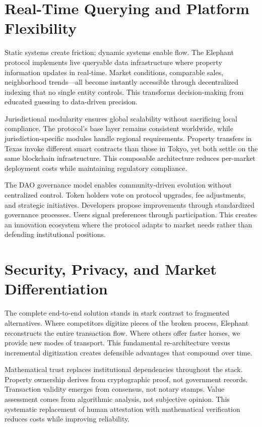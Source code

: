 \section{Real-Time Querying and Platform Flexibility}

Static systems create friction; dynamic systems enable flow. The Elephant protocol implements live queryable data infrastructure where property information updates in real-time. Market conditions, comparable sales, neighborhood trends—all become instantly accessible through decentralized indexing that no single entity controls. This transforms decision-making from educated guessing to data-driven precision.

Jurisdictional modularity ensures global scalability without sacrificing local compliance. The protocol's base layer remains consistent worldwide, while jurisdiction-specific modules handle regional requirements. Property transfers in Texas invoke different smart contracts than those in Tokyo, yet both settle on the same blockchain infrastructure. This composable architecture reduces per-market deployment costs while maintaining regulatory compliance.

The DAO governance model enables community-driven evolution without centralized control. Token holders vote on protocol upgrades, fee adjustments, and strategic initiatives. Developers propose improvements through standardized governance processes. Users signal preferences through participation. This creates an innovation ecosystem where the protocol adapts to market needs rather than defending institutional positions.

\section{Security, Privacy, and Market Differentiation}

The complete end-to-end solution stands in stark contrast to fragmented alternatives. Where competitors digitize pieces of the broken process, Elephant reconstructs the entire transaction flow. Where others offer faster horses, we provide new modes of transport. This fundamental re-architecture versus incremental digitization creates defensible advantages that compound over time.

Mathematical trust replaces institutional dependencies throughout the stack. Property ownership derives from cryptographic proof, not government records. Transaction validity emerges from consensus, not notary stamps. Value assessment comes from algorithmic analysis, not subjective opinion. This systematic replacement of human attestation with mathematical verification reduces costs while improving reliability.

